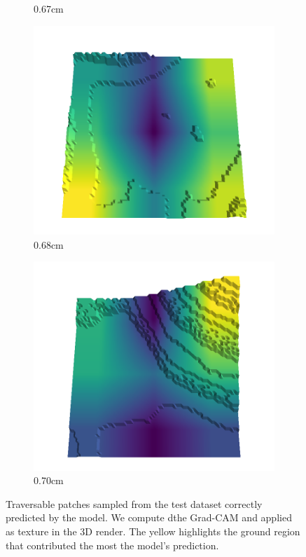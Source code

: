\documentclass[../document.tex]{subfiles}
\begin{document}
\begin{figure}[H]
\begin{subfigure}[b]{0.192\linewidth}
    \caption{0.67cm}
    \label{fig : quarry-best-18}
    \end{subfigure}
    \begin{subfigure}[b]{0.192\linewidth}
    \includegraphics[width=\linewidth]{../img/5/quarry/best/68-patch-3d-majavi-colormap-180.png}
    \caption{0.68cm}
    \label{fig : quarry-best-19}
    \end{subfigure}
    \begin{subfigure}[b]{0.192\linewidth}
    \includegraphics[width=\linewidth]{../img/5/quarry/best/70-patch-3d-majavi-colormap-190.png}
    \caption{0.70cm}
    \label{fig : quarry-best-20}
    \end{subfigure}
    \label{fig : quarry-best}
    \caption{Traversable patches sampled from the test dataset correctly predicted by the model. We compute dthe Grad-CAM and applied as texture in the 3D render. The yellow highlights the ground region that contributed the most the model's prediction. }
    \end{figure}
\end{document}
